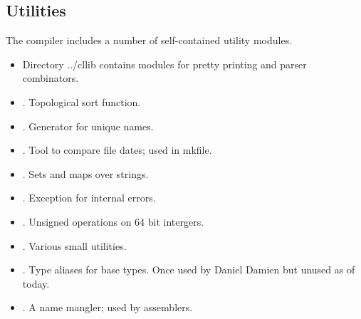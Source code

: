 \documentclass{article}%
\begin{document}
\subsection{Utilities}

The compiler includes a number of self-contained utility modules.

\begin{itemize}
\item Directory {\Tt{}../cllib\nwendquote} contains modules for pretty printing and
parser combinators.

\item {}. Topological sort function.
\item {}. Generator for unique names.
\item {}. Tool to compare file dates; used in
      {\Tt{}mkfile\nwendquote}.
\item {}. Sets and maps over strings.
\item {}. Exception for internal errors.
\item {}. Unsigned operations on 64 bit intergers.
\item {}. Various small utilities.
\item {}. Type aliases for {\ocaml} base types. Once
      used by Daniel Damien but unused as of today.
\item {}. A name mangler; used by assemblers.
\end{itemize}
\end{document}
